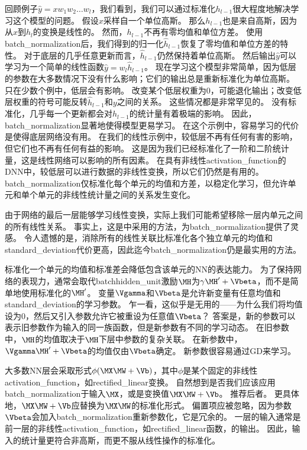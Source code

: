 回顾例子$\hat{y} = x w_1 w_2 \dots w_l$，我们看到，我们可以通过标准化$h_{l-1}$很大程度地解决学习这个模型的问题。
假设$x$采样自一个单位高斯。
那么$h_{l-1}$也是来自高斯，因为从$x$到$h_l$的变换是线性的。
然而，$h_{l-1}$不再有零均值和单位方差。
使用\gls{batch_normalization}后，我们得到的归一化$\hat{h}_{l-1}$恢复了零均值和单位方差的特性。
对于底层的几乎任意更新而言，$\hat{h}_{l-1}$仍然保持着单位高斯。
然后输出$\hat{y}$可以学习为一个简单的线性函数$\hat{y} = w_l \hat{h}_{l-1}$。
现在学习这个模型非常简单，因为低层的参数在大多数情况下没有什么影响；它们的输出总是重新标准化为单位高斯。
只在少数个例中，低层会有影响。
改变某个低层权重为$0$，可能退化输出；改变低层权重的符号可能反转$\hat{h}_{l-1}$和$y$之间的关系。
这些情况都是非常罕见的。
没有标准化，几乎每一个更新都会对$h_{l-1}$的统计量有着极端的影响。
因此，\gls{batch_normalization}显著地使得模型更易学习。
在这个示例中，容易学习的代价是使得底层网络没有用。
在我们的线性示例中，较低层不再有任何有害的影响，但它们也不再有任何有益的影响。
这是因为我们已经标准化了一阶和二阶统计量，这是线性网络可以影响的所有因素。
在具有非线性\gls{activation_function}的\gls{DNN}中，较低层可以进行数据的非线性变换，所以它们仍然是有用的。
\gls{batch_normalization}仅标准化每个单元的均值和方差，以稳定化学习，但允许单元和单个单元的非线性统计量之间的关系发生变化。

由于网络的最后一层能够学习线性变换，实际上我们可能希望移除一层内单元之间的所有线性关系。
事实上，这是\cite{Desjardins2015}中采用的方法，为\gls{batch_normalization}提供了灵感。
令人遗憾的是，消除所有的线性关联比标准化各个独立单元的均值和\gls{standard_deviation}代价更高，因此迄今\gls{batch_normalization}仍是最实用的方法。


标准化一个单元的均值和标准差会降低包含该单元的\gls{NN}的表达能力。
为了保持网络的表现力，通常会取代\gls{batch}\gls{hidden_unit}激励$\MH$为$\gamma \MH' + \Vbeta$，而不是简单地使用标准化的$\MH'$。
变量$\Vgamma$和$\Vbeta$是允许新变量有任意均值和\gls{standard_deviation}的学习参数。
乍一看，这似乎是无用的——为什么我们将均值设为$0$，然后又引入参数允许它被重设为任意值$\Vbeta$？
答案是，新的参数可以表示旧参数作为输入的同一族函数，但是新参数有不同的学习动态。
在旧参数中，$\MH$的均值取决于$\MH$下层中参数的复杂关联。
在新参数中，$\Vgamma \MH' + \Vbeta$的均值仅由$\Vbeta$确定。
新参数很容易通过\gls{GD}来学习。

大多数\gls{NN}层会采取形式$\phi(\MX\MW+ \Vb)$，其中$\phi$是某个固定的非线性\gls{activation_function}，如\gls{rectified_linear}变换。
自然想到是否我们应该应用\gls{batch_normalization}于输入$\MX$，或是变换值$\MX\MW+\Vb$。
\cite{Ioffe+Szegedy-2015}推荐后者。
更具体地，$\MX\MW+\Vb$应替换为$\MX\MW$的标准化形式。
偏置项应被忽略，因为参数$\Vbeta$会加入\gls{batch_normalization}重新参数化，它是冗余的。
一层的输入通常是前一层的非线性\gls{activation_function}，如\gls{rectified_linear}函数，的输出。
因此，输入的统计量更符合非高斯，而更不服从线性操作的标准化。

